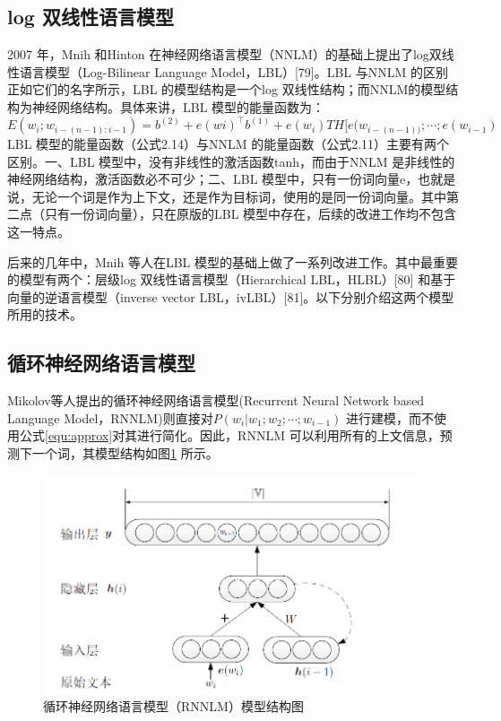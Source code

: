 \documentclass[12pt,a4paper]{article}
\begin{document}
\subsection{log 双线性语言模型}
2007 年，Mnih 和Hinton 在神经网络语言模型（NNLM）的基础上提出了log双线性语言模型（Log-Bilinear Language Model，LBL）[79]。LBL 与NNLM 的区别正如它们的名字所示，LBL 的模型结构是一个log 双线性结构；而NNLM的模型结构为神经网络结构。具体来讲，LBL 模型的能量函数为：
\begin{equation}
  E(w_i;w_{i-(n-1):i-1}) = b^{(2)}+ e(wi)^\top b^{(1)}+e(w_i)TH[e(w_{i-(n-1))};\cdots ; e(w_{i-1})
\end{equation}
LBL 模型的能量函数（公式2.14）与NNLM 的能量函数（公式2.11）主要有两个区别。一、LBL 模型中，没有非线性的激活函数tanh，而由于NNLM 是非线性的神经网络结构，激活函数必不可少；二、LBL 模型中，只有一份词向量e，也就是说，无论一个词是作为上下文，还是作为目标词，使用的是同一份词向量。其中第二点（只有一份词向量），只在原版的LBL 模型中存在，后续的改进工作均不包含这一特点。

后来的几年中，Mnih 等人在LBL 模型的基础上做了一系列改进工作。其中最重要的模型有两个：层级log 双线性语言模型（Hierarchical LBL，HLBL）[80] 和基于向量的逆语言模型（inverse vector LBL，ivLBL）[81]。以下分别介绍这两个模型所用的技术。



\subsection{循环神经网络语言模型}
Mikolov等人提出的循环神经网络语言模型(Recurrent Neural Network based Language Model，RNNLM)则直接对$P(w_i | w_1;w_2;\cdots;w_{i-1}) $ 进行建模，而不使用公式\ref{equ:approx}对其进行简化\cite{mikolov2012statistical,DBLP:conf/interspeech/MikolovKBCK10}。因此，RNNLM 可以利用所有的上文信息，预测下一个词，其模型结构如图\ref{fig:rnnlm} 所示。
\begin{figure}
  \centering
  \includegraphics[width=0.85\linewidth]{./figures/rnnlm.png}
  \caption{循环神经网络语言模型（RNNLM）模型结构图}\label{fig:rnnlm}
\end{figure}
\end{document}
